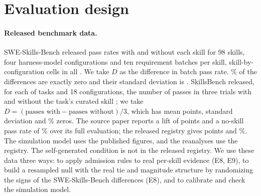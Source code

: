 \section{Evaluation design}
\label{sec:eval}

\paragraph{Released benchmark data.} SWE-Skills-Bench released pass rates with and without each skill for 98 skills, four harness-model configurations and ten requirement batches per skill, \NSweCells{} skill-by-configuration cells in all \citep{han2026sweskillsbench}. We take $D$ as the difference in batch pass rate. \NSweTies\% of the differences are exactly zero and their standard deviation is \NSweSD. SkillsBench released, for each of \NSbTasks{} tasks and 18 configurations, the number of passes in three trials with and without the task's curated skill \citep{li2026skillsbench}; we take $D=(\text{passes with}-\text{passes without})/3$, which has mean \NSbLift{} points, standard deviation \NSbSD{} and \NSbTies\% zeros. The source paper reports a lift of \PCurated{} points and a no-skill pass rate of \PBase\% over its full evaluation; the released registry gives \NSbLift{} points and \NSbPZero\%. The simulation model uses the published figures, and the reanalyses use the registry. The self-generated condition is not in the released registry. We use these data three ways: to apply admission rules to real per-skill evidence (E8, E9), to build a resampled null with the real tie and magnitude structure by randomizing the signs of the SWE-Skills-Bench differences (E8), and to calibrate and check the simulation model.

